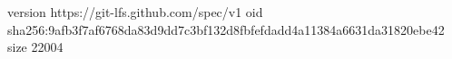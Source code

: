 version https://git-lfs.github.com/spec/v1
oid sha256:9afb3f7af6768da83d9dd7c3bf132d8fbfefdadd4a11384a6631da31820ebe42
size 22004

